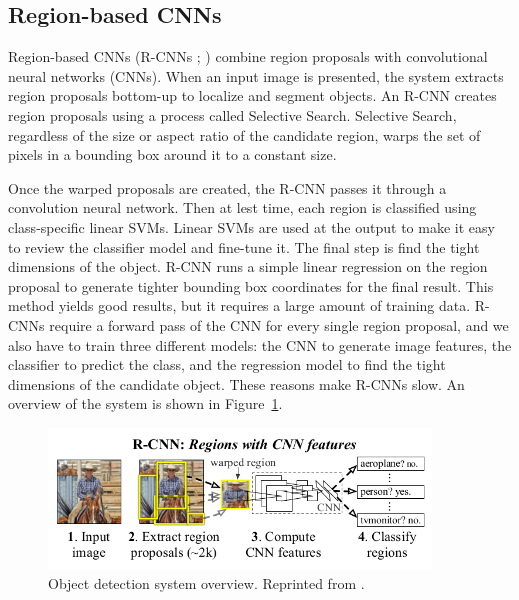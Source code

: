 \subsection{Region-based CNNs}
Region-based CNNs (R-CNNs ; ) combine region proposals with convolutional neural networks (CNNs). When an input image is presented, the system extracts region proposals bottom-up to localize and segment objects. An R-CNN creates region proposals using a process called Selective Search. Selective Search, regardless of the size or aspect ratio of the candidate region, warps the set of pixels in a bounding box around it to a constant size.


 Once the warped proposals are created, the R-CNN passes it through a convolution neural network.
Then at lest time, each region is classified using class-specific linear SVMs. Linear SVMs are used at the output to make it easy to review the classifier model and fine-tune it. The final step is find the tight dimensions of the object. R-CNN runs a simple linear regression on the region proposal to generate tighter bounding box coordinates for the final result. This method yields good results, but it requires a large amount of training data. R-CNNs require a forward pass of the CNN for every single region proposal, and we also have to train three different models: the CNN to generate image features, the classifier to predict the class, and the regression model to find the tight dimensions of the candidate object. These reasons make R-CNNs slow. An overview of the system is shown in Figure~\ref{fig:rcnn}.

\begin{figure}[t]
  \centering
  \includegraphics[width=4in]{figures/rcnn.jpg}  
  \caption[R-CNNs]{Object detection system overview. Reprinted from . }
  \label{fig:rcnn}
\end{figure}

